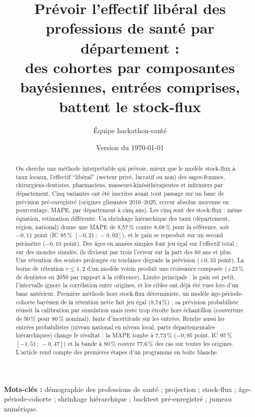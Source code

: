 \documentclass[11pt]{article}
\title{Prévoir l'effectif libéral des professions de santé par département :\\
des cohortes par composantes bayésiennes, entrées comprises, battent le stock-flux}
\author[1]{Équipe hackathon-santé}
\affil[1]{Projet « jumeau numérique de l'offre de soins », dépôt \texttt{hackathon-sante/v2}}
\date{Version du \today}
\begin{document}
\sloppy
\maketitle

\begin{abstract}
On cherche une méthode interprétable qui prévoie, mieux que le modèle stock-flux à taux locaux,
l'effectif \enquote{libéral} (secteur privé, lucratif ou non) des sages-femmes, chirurgiens-dentistes,
pharmaciens, masseurs-kinésithérapeutes et infirmiers par département. Cinq variantes ont été
inscrites avant tout passage sur un banc de prévision pré-enregistré (origines glissantes 2016--2025,
erreur absolue moyenne en pourcentage, MAPE, par département à cinq ans). Les cinq sont des stock-flux :
même équation, estimation différente. Un shrinkage hiérarchique des taux (département, région,
national) donne une MAPE de 8,57\,\%\mesure{} contre 8,68\,\%\mesure{} pour la référence, soit
$-0{,}11$\mesure{} point (IC 95\,\% $[-0{,}21\,;\,-0{,}02]$\mesure), et le gain se reproduit sur un second
périmètre ($-0{,}10$\mesure{} point). Des âges en années simples font jeu égal sur l'effectif total ;
sur des mondes simulés, ils divisent par trois\mesure{} l'erreur sur la part des 60 ans et plus. Une
rétention des seniors prolongée en tendance dégrade la prévision ($+0{,}33$\mesure{} point). La borne de
rétention $r \le 1{,}2$ d'un modèle voisin produit une croissance composée (+23\,\%\mesure{} de dentistes
en 2050 par rapport à la référence). Limite principale : le gain est petit, l'intervalle ignore la
corrélation entre origines, et les cibles ont déjà été vues lors d'un banc antérieur. Première méthode hors stock-flux déterministe, un modèle âge-période-cohorte bayésien de la rétention
nette fait jeu égal (8,74\,\%\mesure) ; sa prévision probabiliste réussit la calibration par
simulation mais reste trop étroite hors échantillon (couverture de 50\,\%\mesure{} pour 80\,\% nominal),
faute d'incertitude sur les entrées. Rendre aussi les entrées probabilistes (niveau national
en niveau local, parts départementales hiérarchiques) change le résultat : la MAPE tombe à
7,73\,\%\mesure{} ($-0{,}95$\mesure{} point, IC 95\,\% $[-1{,}51\,;\,-0{,}47]$\mesure) et la bande à 80\,\%
couvre 77,6\,\%\mesure{} des cas sur toutes les origines. L'article rend compte des premières étapes
d'un programme en boîte blanche.
\end{abstract}


\noindent\textbf{Mots-clés :} démographie des professions de santé ; projection ; stock-flux ; âge-période-cohorte ;
shrinkage hiérarchique ; backtest pré-enregistré ; jumeau numérique.
\end{document}
